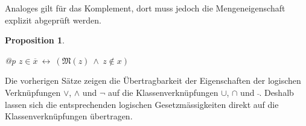 \documentclass[a4paper,german,10pt,twoside]{book}
\newtheorem{prop}[thm]{Proposition}
\theoremstyle{definition}
\theoremstyle{remark}
\begin{document}
\par
Analoges gilt f{\"u}r das Komplement, dort muss jedoch die Mengeneigenschaft explizit abgepr{\"u}ft werden.

\begin{prop}
\label{theorem:complementMember} \hypertarget{theorem:complementMember}{}
\mbox{}
\begin{longtable}{{@{\extracolsep{\fill}}p{\linewidth}}}
\centering $z \in \overline{x}\ \leftrightarrow \ (\mathfrak{M}(z)\ \land \ z \notin x)$
\end{longtable}

\end{prop}




\par
Die vorherigen S{\"a}tze zeigen die {\"U}bertragbarkeit der Eigenschaften der logischen Verkn{\"u}pfungen $\lor$, $\land$ und $\neg$ auf die Klassenverkn{\"u}pfungen $\cup$, $\cap$ und $\bar{~}$. Deshalb lassen sich die entsprechenden logischen Gesetzm{\"a}ssigkeiten direkt auf die Klassenverkn{\"u}pfungen {\"u}bertragen.
\end{document}
